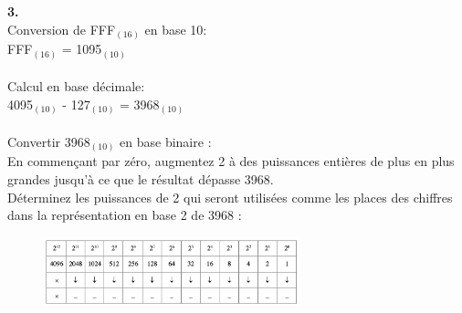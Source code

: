 \begin{Exercice}[20 minutes]
    \textbf{3.}\\
    Conversion de FFF$_{(16)}$ en base 10:\\
    FFF$_{(16)}$ = 1095$_{(10)}$\\\\
    Calcul en base décimale:\\
    4095$_{(10)}$ - 127$_{(10)}$ = 3968$_{(10)}$\\\\
    Convertir 3968$_{(10)}$ en base binaire :\\
    En commençant par zéro, augmentez 2 à des puissances entières de plus en plus grandes jusqu'à ce que le résultat dépasse 3968.\\
    Déterminez les puissances de 2 qui seront utilisées comme les places des chiffres dans la représentation en base 2 de 3968 :
    \begin{figure}[h]
        \includegraphics[width=0.66\textwidth]{img/7.3.png}
    \end{figure}


\end{Exercice}
